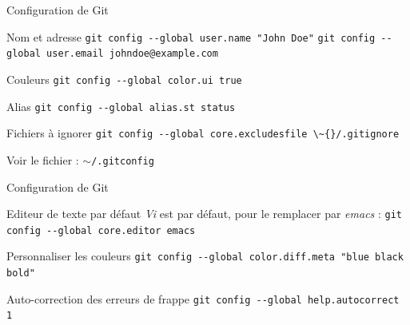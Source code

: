\documentclass{beamer}
\begin{document}
\begin{frame}{Configuration de Git}

  \begin{exampleblock}{Nom et adresse}
    \textcolor{commandcolor}{\verb?git config --global user.name "John Doe"?}\linebreak
    \textcolor{commandcolor}{\verb?git config --global user.email johndoe@example.com?}
  \end{exampleblock}

  \begin{block}{Couleurs}
    \textcolor{commandcolor}{\verb?git config --global color.ui true?}
  \end{block}

  \begin{block}{Alias}
    \textcolor{commandcolor}{\verb?git config --global alias.st status?}
  \end{block}

  \begin{block}{Fichiers à ignorer}
    \textcolor{commandcolor}{\verb?git config --global core.excludesfile \~{}/.gitignore?}
  \end{block}

  Voir le fichier : $\sim$\verb?/.gitconfig?

\end{frame}

\begin{frame}{Configuration de Git}

  \begin{block}{Editeur de texte par défaut}
    \textit{Vi} est par défaut, pour le remplacer par \textit{emacs} :\linebreak
    \textcolor{commandcolor}{\verb?git config --global core.editor emacs?}
  \end{block}
  
  \begin{block}{Personnaliser les couleurs}
    \textcolor{commandcolor}{\verb?git config --global color.diff.meta "blue black bold"?}
  \end{block}
  
  \begin{block}{Auto-correction des erreurs de frappe}
    \textcolor{commandcolor}{\verb?git config --global help.autocorrect 1?}
  \end{block}
  
\end{frame}
\end{document}
